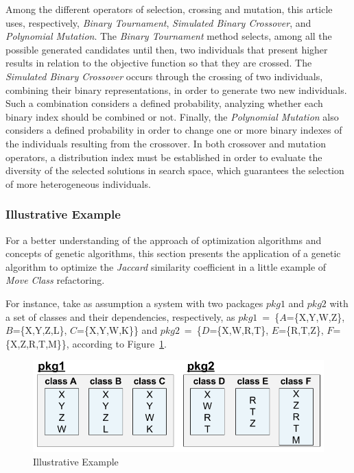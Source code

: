 \documentclass[smallextended,natbib]{svjour3}
\begin{document}
{Among the different operators of selection, crossing and mutation, this article uses, respectively, \textit{Binary Tournament}, \textit{Simulated Binary Crossover}, and \textit{Polynomial Mutation}. %
The \textit{Binary Tournament} method selects, among all the possible generated candidates until then, two individuals that present higher results in relation to the objective function so that they are crossed. The \textit{Simulated Binary Crossover} occurs through the crossing of two individuals, combining their binary representations, in order to generate two new individuals. Such a combination considers a defined probability, analyzing whether each binary index should be combined or not. Finally, the \textit{Polynomial Mutation} also considers a defined probability in order to change one or more binary indexes of the individuals resulting from the crossover. In both crossover and mutation operators, a distribution index must be established in order to evaluate the diversity of the selected solutions in search space, which guarantees the selection of more heterogeneous individuals.

\subsubsection{Illustrative Example}
\label{sec:exemilus}

For a better understanding of the approach of optimization algorithms and concepts of genetic algorithms, this section presents the application of a genetic algorithm to optimize the \textit{Jaccard} similarity coefficient in a little example of \textit{Move Class} refactoring.

For instance, take as assumption a system with two packages $pkg1$ and $pkg2$ with a set of classes and their dependencies, respectively, as $pkg1$~=~\{$A$=\{X,Y,W,Z\}, $B$=\{X,Y,Z,L\}, $C$=\{X,Y,W,K\}\} and $pkg2$~=~\{$D$=\{X,W,R,T\}, $E$=\{R,T,Z\}, $F$=\{X,Z,R,T,M\}\}, according to Figure~\ref{fig:moveeee}.\\[-0.5cm]

\begin{figure}[!ht]
\centering
\includegraphics[scale=0.3]{exemilus.png}
\caption{Illustrative Example}
\label{fig:moveeee}
\vspace{-0.5cm}
\end{figure}

}
\end{document}
